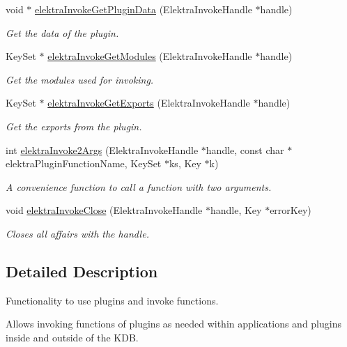 \begin{DoxyCompactItemize}
void $\ast$ \hyperlink{group__invoke_gac615e211a4d3c77addfa18152c274345}{elektra\+Invoke\+Get\+Plugin\+Data} (Elektra\+Invoke\+Handle $\ast$handle)
\begin{DoxyCompactList}\small\item\em Get the data of the plugin. \end{DoxyCompactList}\item 
Key\+Set $\ast$ \hyperlink{group__invoke_gaf3564011b52e96c9754a7b9bc41ea478}{elektra\+Invoke\+Get\+Modules} (Elektra\+Invoke\+Handle $\ast$handle)
\begin{DoxyCompactList}\small\item\em Get the modules used for invoking. \end{DoxyCompactList}\item 
Key\+Set $\ast$ \hyperlink{group__invoke_ga6ab386aba337d8d3fd7978070d613efe}{elektra\+Invoke\+Get\+Exports} (Elektra\+Invoke\+Handle $\ast$handle)
\begin{DoxyCompactList}\small\item\em Get the exports from the plugin. \end{DoxyCompactList}\item 
int \hyperlink{group__invoke_gaa257d93399c60f73c611205bbfa7c9a0}{elektra\+Invoke2\+Args} (Elektra\+Invoke\+Handle $\ast$handle, const char $\ast$elektra\+Plugin\+Function\+Name, Key\+Set $\ast$ks, Key $\ast$k)
\begin{DoxyCompactList}\small\item\em A convenience function to call a function with two arguments. \end{DoxyCompactList}\item 
void \hyperlink{group__invoke_ga684a21daa0b3c20783c55184a9157b3b}{elektra\+Invoke\+Close} (Elektra\+Invoke\+Handle $\ast$handle, Key $\ast$error\+Key)
\begin{DoxyCompactList}\small\item\em Closes all affairs with the handle. \end{DoxyCompactList}\end{DoxyCompactItemize}


\subsection{Detailed Description}
Functionality to use plugins and invoke functions. 

Allows invoking functions of plugins as needed within applications and plugins inside and outside of the K\+DB.

